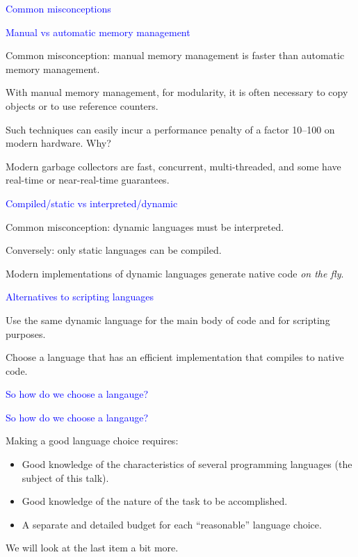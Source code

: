 \documentclass{slides}
\newcommand{\ti}[1]{\begin{center}\Large{\textcolor{blue}{#1}}\end{center}}
\begin{document}
\begin{slide}\ti{Common misconceptions}

\vfill\end{slide}
\begin{slide}\ti{Manual vs automatic memory management}

Common misconception: manual memory management is faster than
automatic memory management.

With manual memory management, for modularity, it is often necessary
to copy objects or to use reference counters.

Such techniques can easily incur a performance penalty of a factor
10--100 on modern hardware.  Why?

Modern garbage collectors are fast, concurrent, multi-threaded, and
some have real-time or near-real-time guarantees.

\vfill\end{slide}
\begin{slide}\ti{Compiled/static vs interpreted/dynamic}

Common misconception: dynamic languages must be interpreted.

Conversely: only static languages can be compiled.

Modern implementations of dynamic languages generate native code
\emph{on the fly}.

\vfill\end{slide}
\begin{slide}\ti{Alternatives to scripting languages}

Use the same dynamic language for the main body of code and for
scripting purposes.

Choose a language that has an efficient implementation that compiles
to native code.

\vfill\end{slide}
\begin{slide}\ti{So how do we choose a langauge?}

\vfill\end{slide}
\begin{slide}\ti{So how do we choose a langauge?}

Making a good language choice requires:

\begin{itemize}
\item Good knowledge of the characteristics of several programming
  languages (the subject of this talk).
\item Good knowledge of the nature of the task to be accomplished.
\item A separate and detailed budget for each ``reasonable'' language
  choice.
\end{itemize}

We will look at the last item a bit more.

\vfill\end{slide}
\end{document}
